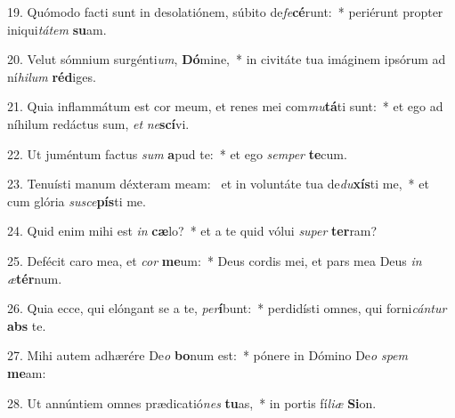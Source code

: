 19. Quómodo facti sunt in desolatiónem, súbito de\textit{fe}\textbf{cé}runt:~*  periérunt propter iniqui\textit{tá}\textit{tem} \textbf{su}am.\

20. Velut sómnium surgénti\textit{um}, \textbf{Dó}mine,~*  in civitáte tua imáginem ipsórum ad ní\textit{hi}\textit{lum} \textbf{réd}iges.\

21. Quia inflammátum est cor meum, et renes mei com\textit{mu}\textbf{tá}ti sunt:~*  et ego ad níhilum redáctus sum, \textit{et} \textit{ne}\textbf{scí}vi.\

22. Ut juméntum factus \textit{sum} \textbf{a}pud te:~*  et ego \textit{sem}\textit{per} \textbf{te}cum.\

23. Tenuísti manum déxteram meam: \dag\  et in voluntáte tua de\textit{du}\textbf{xís}ti me,~*  et cum glória \textit{su}\textit{sce}\textbf{pís}ti me.\

24. Quid enim mihi est \textit{in} \textbf{cæ}lo?~*  et a te quid vólui \textit{su}\textit{per} \textbf{ter}ram?\

25. Defécit caro mea, et \textit{cor} \textbf{me}um:~*  Deus cordis mei, et pars mea Deus \textit{in} \textit{æ}\textbf{tér}num.\

26. Quia ecce, qui elóngant se a te, \textit{per}\textbf{í}bunt:~*  perdidísti omnes, qui forni\textit{cán}\textit{tur} \textbf{abs} te.\

27. Mihi autem adhærére De\textit{o} \textbf{bo}num est:~*  pónere in Dómino De\textit{o} \textit{spem} \textbf{me}am:\

28. Ut annúntiem omnes prædicatió\textit{nes} \textbf{tu}as,~*  in portis fí\textit{li}\textit{æ} \textbf{Si}on.\

